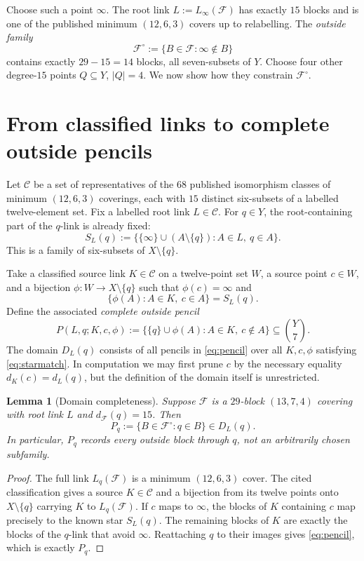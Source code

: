 \documentclass[11pt]{article}
\newcommand{\bin}[2]{\binom{#1}{#2}}
\newcommand{\coverfam}{\mathcal F}
\newcommand{\cat}{\mathcal C}
\newtheorem{lemma}[theorem]{Lemma}
\theoremstyle{definition}
\theoremstyle{remark}
\begin{document}
Choose such a point $\infty$. The root link
$L:=L_\infty(\coverfam)$ has exactly $15$ blocks and is one of the
published minimum $(12,6,3)$ covers up to relabelling. The
\emph{outside family}
\[
 \coverfam^\circ:=\{B\in\coverfam:\infty\notin B\}
\]
contains exactly $29-15=14$ blocks, all seven-subsets of $Y$.
Choose four other degree-$15$ points $Q\subseteq Y$,
$|Q|=4$. We now show how they constrain $\coverfam^\circ$.

\section{From classified links to complete outside pencils}
Let $\cat$ be a set of representatives of the $68$ published
isomorphism classes of minimum $(12,6,3)$ coverings, each with
$15$ distinct six-subsets of a labelled twelve-element set.
Fix a labelled root link $L\in\cat$. For $q\in Y$,
the root-containing part of the $q$-link is already fixed:
\begin{equation}\label{eq:star}
 S_L(q):=\big\{\{\infty\}\cup(A\setminus\{q\}):
                 A\in L,\ q\in A\big\}.
\end{equation}
This is a family of six-subsets of $X\setminus\{q\}$.

Take a classified source link $K\in\cat$ on a twelve-point set $W$,
a source point $c\in W$, and a bijection
$\phi:W\to X\setminus\{q\}$ such that $\phi(c)=\infty$ and
\begin{equation}\label{eq:starmatch}
 \big\{\phi(A):A\in K,\ c\in A\big\}=S_L(q).
\end{equation}
Define the associated \emph{complete outside pencil}
\begin{equation}\label{eq:pencil}
 P(L,q;K,c,\phi):=
 \big\{\{q\}\cup\phi(A): A\in K,\ c\notin A\big\}
 \subseteq\bin{Y}{7}.
\end{equation}
The domain $D_L(q)$ consists of all pencils in
\eqref{eq:pencil} over all $K,c,\phi$ satisfying
\eqref{eq:starmatch}. In computation we may first prune $c$ by the
necessary equality $d_K(c)=d_L(q)$, but the definition of the
domain itself is unrestricted.

\begin{lemma}[Domain completeness]\label{lem:domain}
Suppose $\coverfam$ is a $29$-block $(13,7,4)$ covering with root link
$L$ and $d_\coverfam(q)=15$. Then
\[
 P_q:=\{B\in\coverfam^\circ:q\in B\}\in D_L(q).
\]
In particular, $P_q$ records \emph{every} outside block through $q$,
not an arbitrarily chosen subfamily.
\end{lemma}
\begin{proof}
The full link $L_q(\coverfam)$ is a minimum $(12,6,3)$ cover.
The cited classification gives a source $K\in\cat$ and a bijection
from its twelve points onto $X\setminus\{q\}$ carrying $K$ to
$L_q(\coverfam)$. If $c$ maps to $\infty$, the blocks of $K$ containing
$c$ map precisely to the known star $S_L(q)$.
The remaining blocks of $K$ are exactly the blocks of the $q$-link
that avoid $\infty$. Reattaching $q$ to their images gives
\eqref{eq:pencil}, which is exactly $P_q$.
\end{proof}
\end{document}
